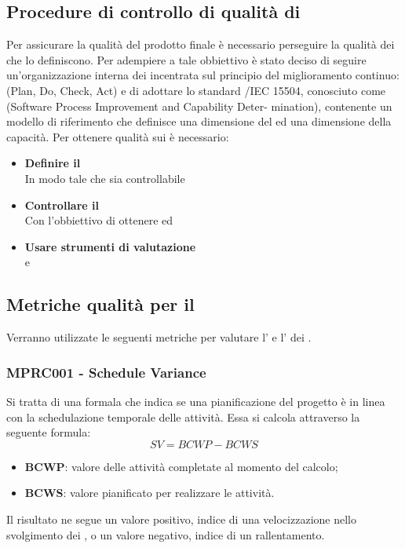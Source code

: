{\subsection{Procedure di controllo di qualità di }
\label{sec:controllo_qualita}
Per assicurare la qualità del prodotto finale è necessario perseguire la qualità dei  che lo definiscono. Per adempiere a tale obbiettivo è stato deciso di seguire un'organizzazione interna dei  incentrata sul principio del miglioramento continuo:  (Plan, Do, Check, Act) e di adottare lo standard /IEC 15504, conosciuto come  (Software Process Improvement and Capability Deter- mination), contenente un modello di riferimento che definisce una dimensione del  ed una dimensione della capacità.
Per ottenere qualità sui  è necessario:
\begin{itemize}
    \item \textbf{Definire il }\\ In modo tale che sia controllabile
    \item \textbf{Controllare il }\\ Con l'obbiettivo di ottenere  ed   
    \item \textbf{Usare strumenti di valutazione}\\  e 
\end{itemize}
\subsection{Metriche qualità per il }
\label{sec:qualita_processo}
Verranno utilizzate le seguenti metriche per valutare l’ e l’ dei .
\subsubsection{MPRC001 - Schedule Variance}
Si tratta di una formala che indica se una pianificazione del progetto è in linea con la schedulazione temporale delle attività. Essa si calcola attraverso la seguente formula:
\begin{displaymath}
    SV = BCWP - BCWS
\end{displaymath}
\begin{itemize}
    \item \textbf{BCWP}: valore delle attività completate al momento del calcolo;
    \item \textbf{BCWS}: valore pianificato per realizzare le attività.
\end{itemize}
Il risultato ne segue un valore positivo, indice di una velocizzazione nello svolgimento dei , o un valore negativo, indice di un rallentamento.
}
